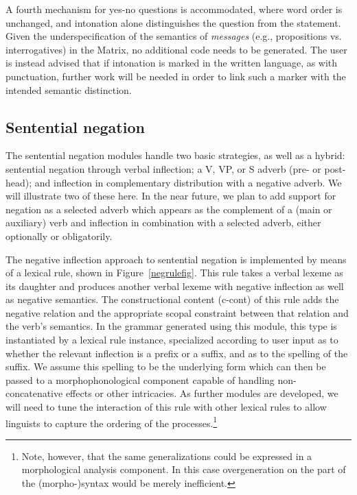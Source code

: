 A fourth mechanism for yes-no questions is accommodated, where word order is
unchanged, and intonation alone distinguishes the question from the statement.
Given the underspecification of the semantics of {\it messages} (e.g.,
propositions vs. interrogatives) in the Matrix, no additional code needs to
be generated.  The user is instead advised that if intonation is marked in 
the written language, as with punctuation, further work will be needed in order
to link such a marker with the intended semantic distinction.

\subsection{Sentential negation}

The sentential negation modules handle two basic strategies, as well
as a hybrid: sentential negation through verbal inflection; a V,
VP, or S adverb (pre- or post-head); and inflection in complementary
distribution with a negative adverb. We will illustrate two of these
here.  In the near future, we plan to add support for negation as a
selected adverb which appears as the complement of a (main or auxiliary) verb 
and inflection in combination with a selected adverb,
either optionally or obligatorily.

The negative inflection approach to sentential negation is implemented
by means of a lexical rule, shown in Figure~\ref{negrulefig}.  This
rule takes a verbal lexeme as its daughter and produces another verbal
lexeme with negative inflection as well as negative semantics.  The
constructional content ({\sc c-cont}) of this rule adds the negative
relation and the appropriate scopal constraint between that relation
and the verb's semantics. In the grammar generated using this module,
this type is instantiated by a lexical rule instance, specialized
according to user input as to whether the relevant inflection is a
prefix or a suffix, and as to the spelling of the suffix.  We assume
this spelling to be the underlying form which can then be passed to a
morphophonological component capable of handling non-concatenative
effects or other intricacies.  As further modules are developed, we
will need to tune the interaction of this rule with other lexical
rules to allow linguists to capture the ordering of the
processes.\footnote{Note, however, that the same generalizations could be
expressed in a morphological analysis component.  In this case
overgeneration on the part of the (morpho-)syntax would be merely
inefficient.}

